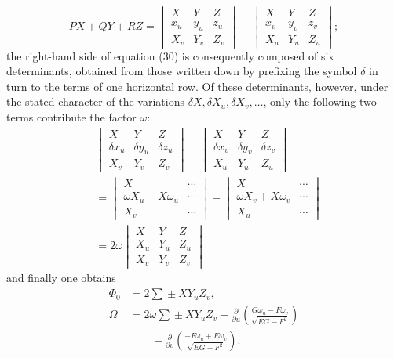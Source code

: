 \documentclass[11pt,a4paper,leqno]{article}
\begin{document}
\[
PX+QY+RZ=
\begin{vmatrix}X&Y&Z\\x_u&y_u&z_u\\X_v&Y_v&Z_v\end{vmatrix}
-\begin{vmatrix}X&Y&Z\\x_v&y_v&z_v\\X_u&Y_u&Z_u\end{vmatrix};
\]
the right-hand side of equation (30) is consequently composed of six
determinants, obtained from those written down by prefixing the symbol
$\delta$ in turn to the terms of one horizontal row. Of these
determinants, however, under the stated character of the variations
$\delta X,\delta X_u,\delta X_v,\ldots$, only the following two terms
contribute the factor $\omega$:
\[
\begin{aligned}
&\begin{vmatrix}X&Y&Z\\
\delta x_u&\delta y_u&\delta z_u\\X_v&Y_v&Z_v\end{vmatrix}
-\begin{vmatrix}X&Y&Z\\
\delta x_v&\delta y_v&\delta z_v\\X_u&Y_u&Z_u\end{vmatrix}\\
&=\begin{vmatrix}X&\cdots\\
\omega X_u+X\omega_u&\cdots\\X_v&\cdots\end{vmatrix}
-\begin{vmatrix}X&\cdots\\
\omega X_v+X\omega_v&\cdots\\X_u&\cdots\end{vmatrix}\\
&=2\omega\begin{vmatrix}X&Y&Z\\X_u&Y_u&Z_u\\X_v&Y_v&Z_v\end{vmatrix}
\end{aligned}
\]
and finally one obtains
\[
\begin{aligned}
\Phi_0&=2\sum\!\pm XY_uZ_v,\\
\Omega&=2\omega\sum\!\pm XY_uZ_v
-\frac{\partial}{\partial u}\left(
\frac{G\omega_u-F\omega_v}{\sqrt{EG-F^2}}\right)\\
&\qquad-\frac{\partial}{\partial v}\left(
\frac{-F\omega_u+E\omega_v}{\sqrt{EG-F^2}}\right).
\end{aligned}
\]
\end{document}
